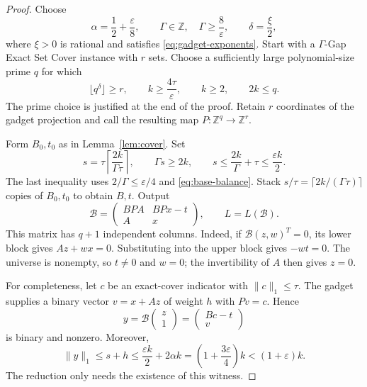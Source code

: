 \documentclass[11pt,letterpaper]{article}
\numberwithin{equation}{section}
\theoremstyle{definition}
\theoremstyle{remark}
\newcommand{\Z}{\mathbb Z}
\newcommand{\cB}{\mathcal B}
\begin{document}
\begin{proof}
Choose
\[
 \alpha=\frac12+\frac\varepsilon8,
 \qquad \Gamma\in\Z,\quad\Gamma\ge\frac8\varepsilon,
 \qquad\delta=\frac\xi2,
\]
where $\xi>0$ is rational and satisfies \eqref{eq:gadget-exponents}. Start with a $\Gamma$-Gap Exact Set Cover instance with $r$ sets. Choose a sufficiently large polynomial-size prime $q$ for which
\begin{equation}\label{eq:base-balance}
 \lfloor q^\delta\rfloor\ge r,
 \qquad k\ge\frac{4\tau}{\varepsilon},
 \qquad k\ge2,
 \qquad2k\le q.
\end{equation}
The prime choice is justified at the end of the proof. Retain $r$ coordinates of the gadget projection and call the resulting map $P:\Z^q\to\Z^r$.

Form $B_0,t_0$ as in Lemma~\ref{lem:cover}. Set
\begin{equation}\label{eq:base-repetition}
 s=\tau\left\lceil\frac{2k}{\Gamma\tau}\right\rceil,
 \qquad\Gamma s\ge2k,
 \qquad s\le\frac{2k}{\Gamma}+\tau\le\frac{\varepsilon k}{2}.
\end{equation}
The last inequality uses $2/\Gamma\le\varepsilon/4$ and \eqref{eq:base-balance}. Stack $s/\tau=\lceil2k/(\Gamma\tau)\rceil$ copies of $B_0,t_0$ to obtain $B,t$. Output
\begin{equation}\label{eq:block-basis}
 \cB=\begin{pmatrix}BPA&BPx-t\\ A&x\end{pmatrix},
 \qquad L=L(\cB).
\end{equation}
This matrix has $q+1$ independent columns. Indeed, if $\cB(z,w)^T=0$, its lower block gives $Az+wx=0$. Substituting into the upper block gives $-wt=0$. The universe is nonempty, so $t\ne0$ and $w=0$; the invertibility of $A$ then gives $z=0$.

For completeness, let $c$ be an exact-cover indicator with $\|c\|_1\le\tau$. The gadget supplies a binary vector $v=x+Az$ of weight $h$ with $Pv=c$. Hence
\[
 y=\cB\begin{pmatrix}z\\1\end{pmatrix}
   =\begin{pmatrix}Bc-t\\v\end{pmatrix}
\]
is binary and nonzero. Moreover,
\[
 \|y\|_1\le s+h
 \le\frac{\varepsilon k}{2}+2\alpha k
 =\left(1+\frac{3\varepsilon}{4}\right)k
 <(1+\varepsilon)k.
\]
The reduction only needs the existence of this witness.


\end{proof}
\end{document}
